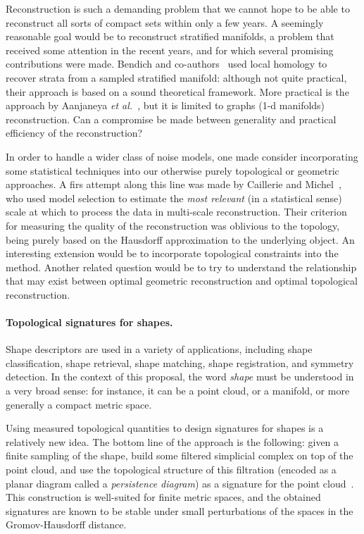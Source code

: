 Reconstruction is such a demanding problem that we cannot hope to be
able to reconstruct all sorts of compact sets within only a few
years. A seemingly reasonable goal would be to reconstruct stratified
manifolds, a problem that received some attention in the recent years,
and for which several promising contributions were made.  Bendich and
co-authors~\cite{bendich-PhD,bendich-strat1,bendich-strat2} used
local homology to recover strata from a sampled stratified manifold:
although not quite practical, their approach is based on a sound
theoretical framework. More practical is the approach by Aanjaneya
{\em et al.}~\cite{metric-graphs-reconstruction}, but it is limited to
graphs (1-d manifolds) reconstruction. Can a compromise be made
between generality and practical efficiency of the reconstruction?

In order to handle a wider class of noise models, one made consider
incorporating some statistical techniques into our otherwise purely
topological or geometric approaches. A firs attempt along this line
was made by Caillerie and Michel~\cite{claire-bertrand}, who used
model selection to estimate the {\em most relevant} (in a statistical
sense) scale at which to process the data in multi-scale
reconstruction. Their criterion for measuring the quality of the
reconstruction was oblivious to the topology, being purely based on
the Hausdorff approximation to the underlying object. An interesting
extension would be to incorporate topological constraints into the
method. Another related question would be to try to understand the
relationship that may exist between optimal geometric reconstruction
and optimal topological reconstruction.


\paragraph{Topological signatures for shapes.}

Shape descriptors are used in a variety of applications, including
shape classification, shape retrieval, shape matching, shape
registration, and symmetry detection. In the context of this proposal,
the word {\em shape} must be understood in a very broad sense: for
instance, it can be a point cloud, or a
manifold, or more generally a compact metric space.

Using measured topological quantities to design signatures for shapes
is a relatively new idea. The bottom line of the approach is the
following: given a finite sampling of the shape, build some filtered
simplicial complex on top of the point cloud, and use the topological
structure of this filtration (encoded as a planar diagram called a
{\em persistence diagram}) as a signature for the point
cloud~\cite{ccgmo-ghsssp-09, socg-pbsds-10}. This construction is
well-suited for finite metric spaces, and the obtained signatures are
known to be stable under small perturbations of the spaces in the
Gromov-Hausdorff distance.  

